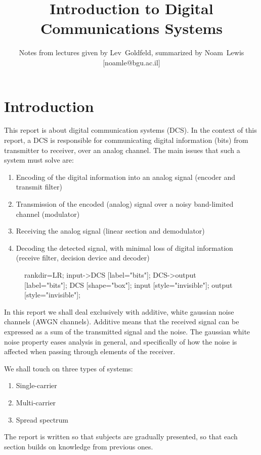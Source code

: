 \documentclass[onecolumn,x11names,technote,twoside,a4paper,10pt,english]{IEEEtran}
\begin{document}
\title{Introduction to Digital Communications Systems}
\author{Notes from lectures given by Lev~Goldfeld, summarized by Noam~Lewis [noamle@bgu.ac.il]}

\maketitle
\clearpage
\section{Introduction}
This report is about  digital communication systems (DCS). In the context of this report, a DCS is responsible for communicating digital information (bits) from transmitter to receiver, over an analog channel. The main issues that such a system must solve are:
\begin{enumerate}
\item Encoding of the digital information into an analog signal (encoder and transmit filter)
\item Transmission of the encoded (analog) signal over a noisy band-limited channel (modulator)
\item Receiving the analog signal  (linear section and demodulator)
\item Decoding the detected signal, with minimal loss of digital information (receive filter, decision device and decoder)
\end{enumerate}

\begin{figure}[h!]
  \centering
  \begin{dotpic}[width=2in]
    rankdir=LR; 
    input->DCS [label="bits\nsent"];
    DCS->output [label="bits\nreceived"];
    DCS [shape="box"];
    input [style="invisible"];
    output [style="invisible"];
  \end{dotpic}
  \label{fig:DCS}
\end{figure}

In this report we shall deal exclusively with additive, white gaussian noise channels (AWGN channels). Additive means that the received signal can be expressed as a sum of the transmitted signal and the noise. The gaussian white noise property eases analysis in general, and specifically of how the noise is affected when passing through elements of the receiver.

We shall touch on three types of systems:
\begin{enumerate}
\item Single-carrier
\item Multi-carrier
\item Spread spectrum
\end{enumerate}
The report is written so that subjects are gradually presented, so that each section builds on knowledge from previous ones.
\end{document}
